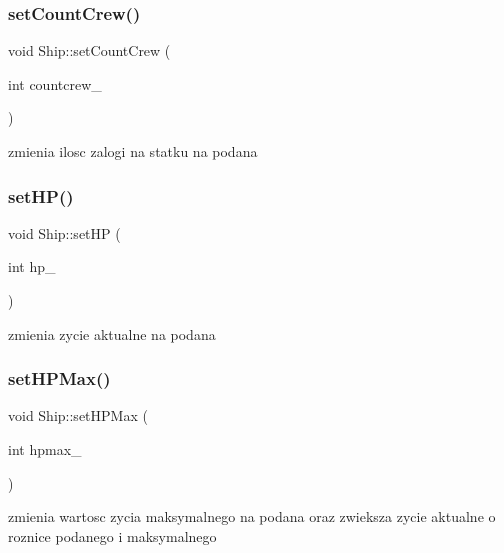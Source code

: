 \subsubsection{\texorpdfstring{set\+Count\+Crew()}{setCountCrew()}}
{\footnotesize\ttfamily void Ship\+::set\+Count\+Crew (\begin{DoxyParamCaption}\item[{int}]{countcrew\+\_\+ }\end{DoxyParamCaption})\hspace{0.3cm}{\ttfamily [inline]}}



zmienia ilosc zalogi na statku na podana 

\mbox{\label{class_ship_a53ac9d01792ca3cdbc7c35e38240867a}} 
\subsubsection{\texorpdfstring{set\+H\+P()}{setHP()}}
{\footnotesize\ttfamily void Ship\+::set\+HP (\begin{DoxyParamCaption}\item[{int}]{hp\+\_\+ }\end{DoxyParamCaption})\hspace{0.3cm}{\ttfamily [inline]}}



zmienia zycie aktualne na podana 

\mbox{\label{class_ship_a90a24cf803f294ab17d0900379268fc2}} 
\subsubsection{\texorpdfstring{set\+H\+P\+Max()}{setHPMax()}}
{\footnotesize\ttfamily void Ship\+::set\+H\+P\+Max (\begin{DoxyParamCaption}\item[{int}]{hpmax\+\_\+ }\end{DoxyParamCaption})}



zmienia wartosc zycia maksymalnego na podana oraz zwieksza zycie aktualne o roznice podanego i maksymalnego 

\mbox{\label{class_ship_a740a100b66b4f2ee628994c0c16da24b}} 
